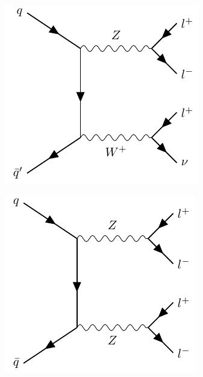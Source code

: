 \begin{figure}[!h] 
  \begin{subfigure}[b]{0.3\linewidth}
    \centering
    \hspace*{-0.9cm}
    \includegraphics[width=\textwidth]{ubonn-thesis/Chapters/Chapters_04/Figure/Feynman_WZ.pdf}
    \caption{}
    \label{WZ}
  \end{subfigure}%
  \begin{subfigure}[b]{0.3\linewidth}
    \centering
    \includegraphics[width=\textwidth]{ubonn-thesis/Chapters/Chapters_04/Figure/Feynman_ZZ.pdf} 

\end{subfigure}
\end{figure}
